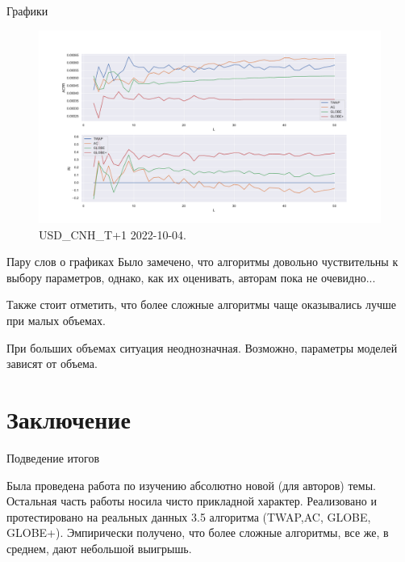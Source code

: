 \documentclass[aspectratio=169]{beamer}
\begin{document}
    \begin{frame}{Графики}

        \begin{figure}  
            \centering
            \includegraphics[width=0.83\linewidth]{USD_CNH_T+1 2022-10-04 T = 50 W = 500 x1000}
            \caption{USD\_CNH\_T+1 2022-10-04. }
        \end{figure}
        
    \end{frame}


    \begin{frame}{Пару слов о графиках}
        Было замечено, что алгоритмы довольно чуствительны к выбору параметров, однако, как их оценивать, авторам пока не очевидно...

        Также стоит отметить, что более сложные алгоритмы чаще оказывались лучше при малых объемах. 

        При больших объемах ситуация неоднозначная. Возможно, параметры моделей зависят от объема. 
        
    \end{frame}

    \section{Заключение}

    \begin{frame}{Подведение итогов}

        Была проведена работа по изучению абсолютно новой (для авторов) темы. 
        Остальная часть работы носила чисто прикладной характер.
        Реализовано и протестировано на реальных данных 3.5 алгоритма (TWAP,AC, GLOBE, GLOBE+). Эмпирически получено, что более сложные алгоритмы, все же, в среднем, дают небольшой выигрышь. 
        
        
        
    \end{frame}
\end{document}
